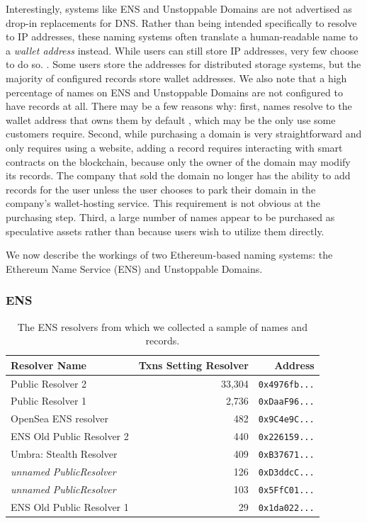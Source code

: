 Interestingly, systems like ENS and Unstoppable Domains are not advertised as 
drop-in replacements for DNS. Rather than being intended specifically to 
resolve to IP addresses, these naming systems often translate a human-readable 
name to a \emph{wallet address} instead. While users can still store IP 
addresses, very few choose to do so. . Some users store the addresses for distributed 
	storage 
systems, but the majority of configured records store wallet addresses. We also 
note that a high percentage of names on ENS and Unstoppable Domains are not 
configured to have records at all. There may be a few reasons why: first, names 
resolve to the wallet address that owns them by default , which may be the only use some customers require. Second, 
	while 
purchasing a domain is very straightforward and only requires using a website, 
adding a record requires interacting with smart contracts on the blockchain, 
because only the owner of the domain may modify its records. The company that 
sold the domain no longer has the ability to add records for the user unless 
the user chooses to park their domain in the company's wallet-hosting service. 
This requirement is not obvious at the purchasing step. Third, a large number 
of names appear to be purchased as speculative assets rather than because users 
wish to utilize them directly. 

We now describe the workings of two Ethereum-based naming systems: the 
Ethereum Name Service (ENS) and Unstoppable Domains. 
\subsubsection{ENS}

\begin{table}
	\begin{tabular}{lrr}
		\toprule
		Resolver Name & Txns Setting Resolver & Address \\
		\midrule 
		Public Resolver 2 & 33,304 & \texttt{0x4976fb...} \\
		Public Resolver 1 & 2,736 & \texttt{0xDaaF96...} \\
		OpenSea ENS resolver & 482 & \texttt{0x9C4e9C...} \\
		ENS Old Public Resolver 2 & 440	& \texttt{0x226159...} \\
		Umbra: Stealth Resolver & 409 & \texttt{0xB37671...} \\
		\textit{unnamed PublicResolver} & 126 & \texttt{0xD3ddcC...} \\
		\textit{unnamed PublicResolver} & 103 & \texttt{0x5FfC01...} \\
		ENS Old Public Resolver 1 & 29 & \texttt{0x1da022...} \\
		\bottomrule
	\end{tabular}
	\label{tab:ens_resolvers}
	\caption{The ENS resolvers from which we collected a sample of names and 
		records.}
\end{table}

